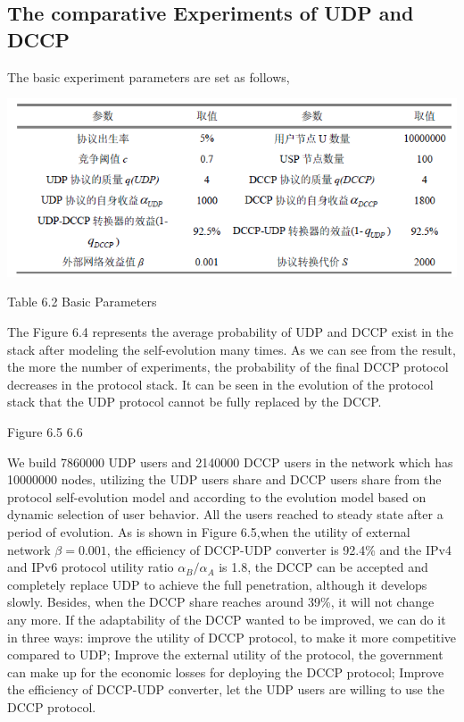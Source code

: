 \documentclass{article}
\begin{document}
\subsection{The comparative Experiments of UDP and DCCP}
The basic experiment parameters are set as follows,
\par
\centerline{\includegraphics[width=.6\textwidth]{Table6.png}}
\centerline{Table 6.2 Basic Parameters}
The Figure 6.4 represents the average probability of UDP and DCCP exist in the stack after modeling the self-evolution
many times. As we can see from the result, the more the number of experiments, the probability of the final DCCP
protocol decreases in the protocol stack.  It can be seen in the evolution of the protocol stack that the UDP protocol
cannot be fully replaced by the DCCP.

Figure 6.5 6.6

We build 7860000 UDP users and 2140000 DCCP users in the network which has 10000000 nodes, utilizing the UDP users
share and DCCP users share from the protocol self-evolution model and according to the evolution model based on
dynamic selection of user behavior. All the users reached to steady state after a period of evolution. As is shown
in Figure 6.5,when the utility of external network $\beta=0.001$, the efficiency of DCCP-UDP converter is 92.4\%
and the IPv4 and IPv6 protocol utility ratio $\alpha_B/\alpha_A$ is 1.8, the DCCP can be accepted and completely
replace UDP to achieve the full penetration, although it develops slowly. Besides, when the DCCP share reaches around
39\%, it will not change any more. If the adaptability of the DCCP wanted to be improved, we can do it in three ways:
improve the utility of DCCP protocol, to make it more competitive compared to UDP; Improve the external utility of
the protocol, the government can make up for the economic losses for deploying the DCCP protocol; Improve the efficiency
of DCCP-UDP converter, let the UDP users are willing to use the DCCP protocol.
\end{document}
